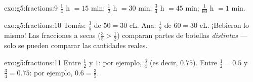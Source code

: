 \begin{solution}{exo:g5:fractions:9}
$\frac14$ h $= 15$ min; $\frac12$ h $= 30$ min; $\frac34$ h $= 45$
min; $\frac{1}{60}$ h $= 1$ min.
\end{solution}

\begin{solution}{exo:g5:fractions:10}
Tomás: $\frac35$ de $50 = 30$ cL. Ana: $\frac12$ de $60 = 30$ cL. ¡Bebieron
lo mismo! Las fracciones a secas ($\frac35 > \frac12$)
comparan partes de botellas \emph{distintas} --- solo se pueden comparar
las cantidades reales.
\end{solution}

\begin{solution}{exo:g5:fractions:11}
Entre $\frac12$ y $1$: por ejemplo, $\frac34$ (es decir, $0.75$).
Entre $\frac12 = 0.5$ y $\frac34 = 0.75$: por ejemplo, $0.6 =
\frac35$.
\end{solution}
